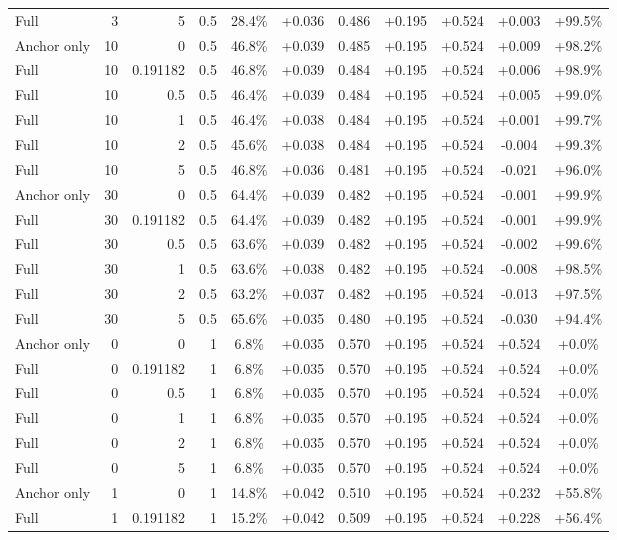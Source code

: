 \begin{table}[htbp]
\begin{tabular}{lrrrccccccc}
Full & 3 & 5 & 0.5 & 28.4\% & +0.036 & 0.486 & +0.195 & +0.524 & +0.003 & +99.5\% \\
Anchor only & 10 & 0 & 0.5 & 46.8\% & +0.039 & 0.485 & +0.195 & +0.524 & +0.009 & +98.2\% \\
Full & 10 & 0.191182 & 0.5 & 46.8\% & +0.039 & 0.484 & +0.195 & +0.524 & +0.006 & +98.9\% \\
Full & 10 & 0.5 & 0.5 & 46.4\% & +0.039 & 0.484 & +0.195 & +0.524 & +0.005 & +99.0\% \\
Full & 10 & 1 & 0.5 & 46.4\% & +0.038 & 0.484 & +0.195 & +0.524 & +0.001 & +99.7\% \\
Full & 10 & 2 & 0.5 & 45.6\% & +0.038 & 0.484 & +0.195 & +0.524 & -0.004 & +99.3\% \\
Full & 10 & 5 & 0.5 & 46.8\% & +0.036 & 0.481 & +0.195 & +0.524 & -0.021 & +96.0\% \\
Anchor only & 30 & 0 & 0.5 & 64.4\% & +0.039 & 0.482 & +0.195 & +0.524 & -0.001 & +99.9\% \\
Full & 30 & 0.191182 & 0.5 & 64.4\% & +0.039 & 0.482 & +0.195 & +0.524 & -0.001 & +99.9\% \\
Full & 30 & 0.5 & 0.5 & 63.6\% & +0.039 & 0.482 & +0.195 & +0.524 & -0.002 & +99.6\% \\
Full & 30 & 1 & 0.5 & 63.6\% & +0.038 & 0.482 & +0.195 & +0.524 & -0.008 & +98.5\% \\
Full & 30 & 2 & 0.5 & 63.2\% & +0.037 & 0.482 & +0.195 & +0.524 & -0.013 & +97.5\% \\
Full & 30 & 5 & 0.5 & 65.6\% & +0.035 & 0.480 & +0.195 & +0.524 & -0.030 & +94.4\% \\
Anchor only & 0 & 0 & 1 & 6.8\% & +0.035 & 0.570 & +0.195 & +0.524 & +0.524 & +0.0\% \\
Full & 0 & 0.191182 & 1 & 6.8\% & +0.035 & 0.570 & +0.195 & +0.524 & +0.524 & +0.0\% \\
Full & 0 & 0.5 & 1 & 6.8\% & +0.035 & 0.570 & +0.195 & +0.524 & +0.524 & +0.0\% \\
Full & 0 & 1 & 1 & 6.8\% & +0.035 & 0.570 & +0.195 & +0.524 & +0.524 & +0.0\% \\
Full & 0 & 2 & 1 & 6.8\% & +0.035 & 0.570 & +0.195 & +0.524 & +0.524 & +0.0\% \\
Full & 0 & 5 & 1 & 6.8\% & +0.035 & 0.570 & +0.195 & +0.524 & +0.524 & +0.0\% \\
Anchor only & 1 & 0 & 1 & 14.8\% & +0.042 & 0.510 & +0.195 & +0.524 & +0.232 & +55.8\% \\
Full & 1 & 0.191182 & 1 & 15.2\% & +0.042 & 0.509 & +0.195 & +0.524 & +0.228 & +56.4\% \\

\end{tabular}
\end{table}
